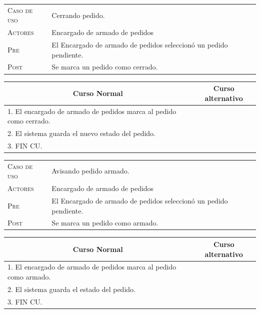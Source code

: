 \begin{tabular}{p{} p{}}
    \textsc{Caso de uso} & Cerrando pedido. \\
    \textsc{Actores} & Encargado de armado de pedidos \\
    \textsc{Pre} & El Encargado de armado de pedidos seleccionó un pedido
    pendiente. \\
    \textsc{Post} & Se marca un pedido como cerrado. \\
\end{tabular}

\begin{center}
\begin{tabular}{|p{}|p{}|}
    \hline
    \multicolumn{1}{|c|}{Curso Normal} &
    \multicolumn{1}{|c|}{Curso alternativo} \\
    \hline
    1. El encargado de armado de pedidos marca al pedido como cerrado. & \\
    2. El sistema guarda el nuevo estado del pedido. & \\
    3. FIN CU. & \\
    \hline
\end{tabular}
\end{center}


\begin{tabular}{p{} p{}}
    \textsc{Caso de uso} & Avisando pedido armado. \\
    \textsc{Actores} & Encargado de armado de pedidos \\
    \textsc{Pre} & El Encargado de armado de pedidos seleccionó un pedido
    pendiente. \\
    \textsc{Post} & Se marca un pedido como armado. \\
\end{tabular}

\begin{center}
\begin{tabular}{|p{}|p{}|}
    \hline
    \multicolumn{1}{|c|}{Curso Normal} &
    \multicolumn{1}{|c|}{Curso alternativo} \\
    \hline
    1. El encargado de armado de pedidos marca al pedido como armado. & \\
    2. El sistema guarda el estado del pedido. & \\
    3. FIN CU. & \\
    \hline
\end{tabular}
\end{center}


